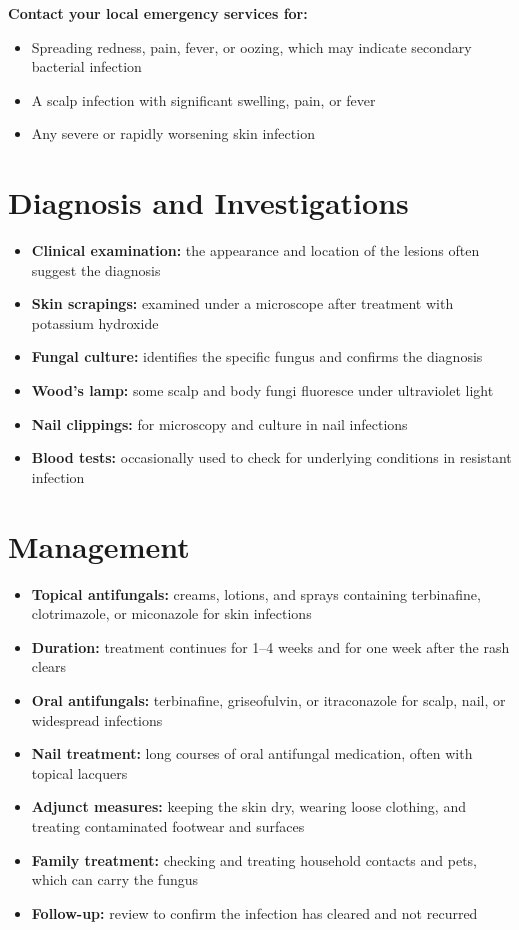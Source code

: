\textbf{Contact your local emergency services for:}
\begin{itemize}
    \item Spreading redness, pain, fever, or oozing, which may indicate secondary bacterial infection
    \item A scalp infection with significant swelling, pain, or fever
    \item Any severe or rapidly worsening skin infection
\end{itemize}

\section*{Diagnosis and Investigations}
\begin{itemize}
    \item \textbf{Clinical examination:} the appearance and location of the lesions often suggest the diagnosis
    \item \textbf{Skin scrapings:} examined under a microscope after treatment with potassium hydroxide
    \item \textbf{Fungal culture:} identifies the specific fungus and confirms the diagnosis
    \item \textbf{Wood's lamp:} some scalp and body fungi fluoresce under ultraviolet light
    \item \textbf{Nail clippings:} for microscopy and culture in nail infections
    \item \textbf{Blood tests:} occasionally used to check for underlying conditions in resistant infection
\end{itemize}

\section*{Management}
\begin{itemize}
    \item \textbf{Topical antifungals:} creams, lotions, and sprays containing terbinafine, clotrimazole, or miconazole for skin infections
    \item \textbf{Duration:} treatment continues for 1--4 weeks and for one week after the rash clears
    \item \textbf{Oral antifungals:} terbinafine, griseofulvin, or itraconazole for scalp, nail, or widespread infections
    \item \textbf{Nail treatment:} long courses of oral antifungal medication, often with topical lacquers
    \item \textbf{Adjunct measures:} keeping the skin dry, wearing loose clothing, and treating contaminated footwear and surfaces
    \item \textbf{Family treatment:} checking and treating household contacts and pets, which can carry the fungus
    \item \textbf{Follow-up:} review to confirm the infection has cleared and not recurred
\end{itemize}

